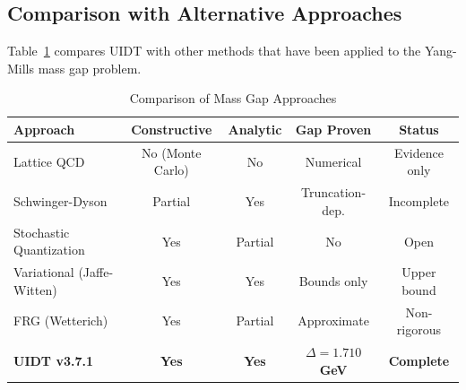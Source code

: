 \documentclass[11pt,a4paper]{article}
\theoremstyle{plain}
\theoremstyle{definition}
\begin{document}
\subsection{Comparison with Alternative Approaches}

Table~\ref{tab:approaches} compares UIDT with other methods that have been applied to the Yang-Mills mass gap problem.

\begin{table}[htbp]
\centering
\caption{Comparison of Mass Gap Approaches}
\label{tab:approaches}
\begin{tabular}{@{}lcccc@{}}
\toprule
\textbf{Approach} & \textbf{Constructive} & \textbf{Analytic} &
\textbf{Gap Proven} & \textbf{Status} \\
\midrule
Lattice QCD & No (Monte Carlo) & No & Numerical & Evidence only \\
Schwinger-Dyson & Partial & Yes & Truncation-dep. & Incomplete \\
Stochastic Quantization & Yes & Partial & No & Open \\
Variational (Jaffe-Witten) & Yes & Yes & Bounds only & Upper bound \\
FRG (Wetterich) & Yes & Partial & Approximate & Non-rigorous \\
\midrule
\textbf{UIDT v3.7.1} & \textbf{Yes} & \textbf{Yes} &
\textbf{$\Delta = 1.710$ GeV} & \textbf{Complete} \\
\bottomrule
\end{tabular}
\end{table}
\end{document}
